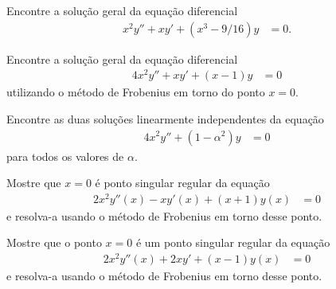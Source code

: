 \documentclass[a4paper,12pt, leqno, answers]{exam}
\begin{document}
\begin{questions}
    \question[E de 2006] Encontre a solu\c{c}\~{a}o geral da equa\c{c}\~{a}o diferencial
    \begin{align*}
        x^2 y'' + x y' + \left( x^3 - 9/16 \right) y &= 0.
    \end{align*}
    \begin{solution}
    \end{solution}

    \question[P1 de 2008] Encontre a solu\c{c}\~{a}o geral da equa\c{c}\~{a}o diferencial
    \begin{align*}
        4 x^2 y'' + x y' + (x - 1) y &= 0
    \end{align*}
    utilizando o m\'{e}todo de Frobenius em torno do ponto $x = 0$.
    \begin{solution}
    \end{solution}

    \question[P1 de 2008] Encontre as duas solu\c{c}\~{o}es linearmente independentes da equa\c{c}\~{a}o
    \begin{align*}
        4 x^2 y'' + (1 - \alpha^2) y &= 0
    \end{align*}
    para todos os valores de $\alpha$.
    \begin{solution}
    \end{solution}

    \question[E de 2008] Mostre que $x = 0$ \'{e} ponto singular regular da equa\c{c}\~{a}o
    \begin{align*}
        2 x^2 y''(x) - x y'(x) + (x + 1) y(x) &= 0
    \end{align*}
    e resolva-a usando o m\'{e}todo de Frobenius em torno desse ponto.
    \begin{solution}
    \end{solution}

    \question[E de 2008] Mostre que o ponto $x = 0$ \'{e} um ponto singular regular da equa\c{c}\~{a}o
    \begin{align*}
        2 x^2 y''(x) + 2 x y' + (x - 1) y(x) &= 0
    \end{align*}
    e resolva-a usando o m\'{e}todo de Frobenius em torno desse ponto.
    \begin{solution}
    \end{solution}


\end{questions}
\end{document}
